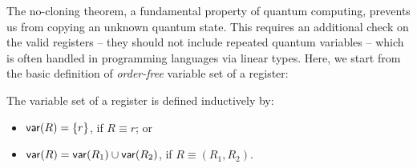 The no-cloning theorem, a fundamental property of quantum computing, prevents us from copying an unknown quantum state. This requires an additional check on the valid registers -- they should not include repeated quantum variables -- which is often handled in programming languages via linear types. Here, we start from the basic definition of \emph{order-free} variable set of a register:
\begin{definition}
The variable set of a register is defined inductively by:
\begin{itemize}
    \item $\mathsf{var}(R) = \{r\}$, if $R\equiv r$; or
    \item $\mathsf{var}(R) = \mathsf{var}(R_1) \cup\mathsf{var}(R_2)$, if $R\equiv (R_1,R_2)$.
\end{itemize}
\end{definition}



